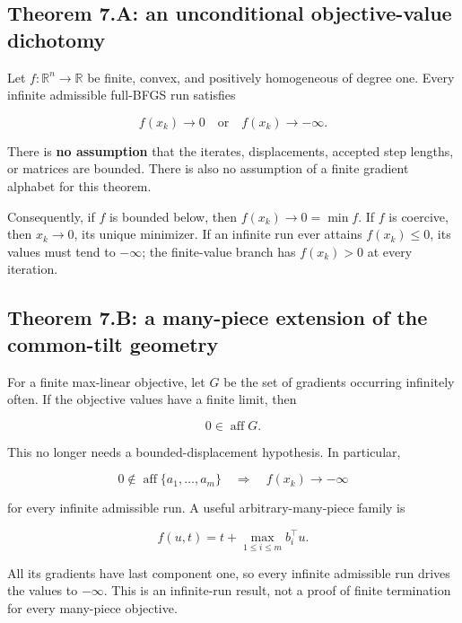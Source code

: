 \subsection{Theorem 7.A: an unconditional objective-value
dichotomy}\label{H:theorem-a-an-unconditional-objective-value-dichotomy}

Let \(f:\mathbb R^n\to\mathbb R\) be finite, convex, and positively
homogeneous of degree one. Every infinite admissible full-BFGS run
satisfies

\[
\boxed{f(x_k)\longrightarrow0\quad\text{or}\quad f(x_k)\longrightarrow-\infty.}
\]

There is \textbf{no assumption} that the iterates, displacements,
accepted step lengths, or matrices are bounded. There is also no
assumption of a finite gradient alphabet for this theorem.

Consequently, if \(f\) is bounded below, then \(f(x_k)\to0=\min f\). If
\(f\) is coercive, then \(x_k\to0\), its unique minimizer. If an
infinite run ever attains \(f(x_k)\le0\), its values must tend to
\(-\infty\); the finite-value branch has \(f(x_k)>0\) at every
iteration.



\subsection{Theorem 7.B: a many-piece extension of the common-tilt
geometry}\label{H:theorem-b-a-many-piece-extension-of-the-common-tilt-geometry}

For a finite max-linear objective, let \(G\) be the set of gradients
occurring infinitely often. If the objective values have a finite limit,
then

\[
\boxed{0\in\operatorname{aff}G.}
\]

This no longer needs a bounded-displacement hypothesis. In particular,

\[
0\notin\operatorname{aff}\{a_1,\ldots,a_m\}
\quad\Longrightarrow\quad
f(x_k)\longrightarrow-\infty
\]

for every infinite admissible run. A useful arbitrary-many-piece family
is

\[
\boxed{f(u,t)=t+\max_{1\le i\le m}b_i^\top u.}
\]

All its gradients have last component one, so every infinite admissible
run drives the values to \(-\infty\). This is an infinite-run result,
not a proof of finite termination for every many-piece objective.

